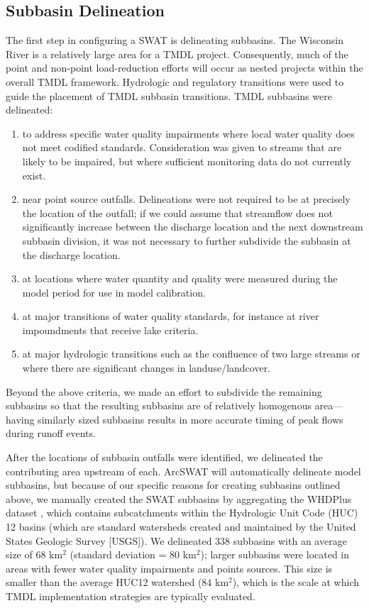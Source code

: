 \subsection{Subbasin Delineation}\label{sec:sub_delineation}
The first step in configuring a SWAT is delineating subbasins. The Wisconsin River is a relatively large area for a TMDL project. Consequently, much of the point and non-point load-reduction efforts will occur as nested projects within the overall TMDL framework.
Hydrologic and regulatory transitions were used to guide the placement of TMDL subbasin transitions. TMDL subbasins were delineated: 
\begin{enumerate}
	\item to address specific water quality impairments where local water quality does not meet codified standards. Consideration was given to streams that are likely to be impaired, but where sufficient monitoring data do not currently exist.
	\item near point source outfalls. Delineations were not required to be at precisely the location of the outfall; if we could assume that streamflow does not significantly increase between the discharge location and the next downstream subbasin division, it was not necessary to further subdivide the subbasin at the discharge location.
	\item at locations where water quantity and quality were measured during the model period for use in model calibration.
	\item at major transitions of water quality standards, for instance at river impoundments that receive lake criteria.
	\item at major hydrologic transitions such as the confluence of two large streams or where there are significant changes in landuse/landcover.
\end{enumerate}

Beyond the above criteria, we made an effort to subdivide the remaining subbasins so that the resulting subbasins are of relatively homogenous area---having similarly sized subbasins results in more accurate timing of peak flows during runoff events.

After the locations of subbasin outfalls were identified, we delineated the contributing area upstream of each.
ArcSWAT will automatically delineate model subbasins, but because of our specific reasons for creating subbasins outlined above, we manually created the SWAT subbasins by aggregating the WHDPlus dataset \citep{wdnr_whdplus_2013}, which contains subcatchments within the Hydrologic Unit Code (HUC) 12 basins (which are standard watersheds created and maintained by the United States Geologic Survey [USGS]). 
We delineated 338 subbasins with an average size of 68 km$^2$ (standard deviation = 80 km$^2$); larger subbasins were located in areas with fewer water quality impairments and points sources. This size is smaller than the average HUC12 watershed (84 km$^2$), which is the scale at which TMDL implementation strategies are typically evaluated.